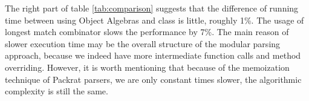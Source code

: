 The right part of table \ref{tab:comparison} suggests that the difference of running time between
using Object Algebras and class is little, roughly 1\%.
The usage of longest match combinator slows the performance by 7\%. The main reason of slower
execution time may be the overall structure of the modular parsing approach, because we indeed have
more intermediate function calls and method overriding. However, it is worth mentioning that
because of the memoization technique of Packrat parsers, we are only constant times
slower, the algorithmic complexity is still the same.
